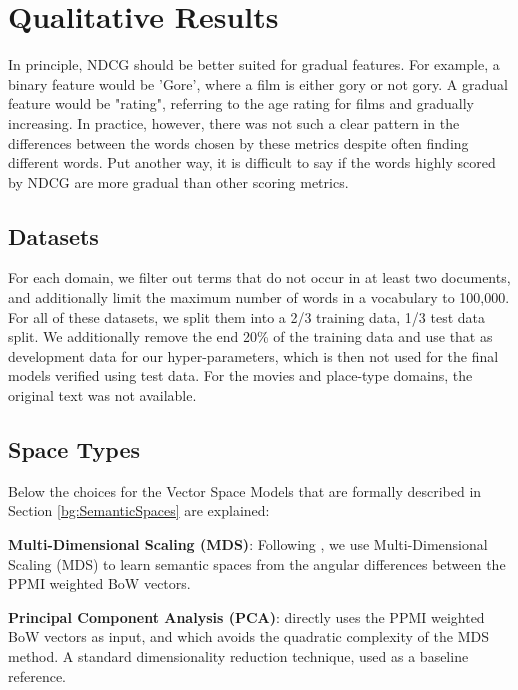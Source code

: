 \section{Qualitative Results}
In principle, NDCG should be better suited for gradual features. For example, a binary feature would be 'Gore', where a film is either gory or not gory. A gradual feature would be "rating", referring to the age rating for films and gradually increasing. In practice, however, there was not such a clear pattern in the differences between the words chosen by these metrics despite often finding different words. Put another way, it is difficult to say if the words highly scored by NDCG are more gradual than other scoring metrics.
\subsection{Datasets}\label{ch3:datasets}



 For each domain, we filter out terms that do not occur in at least two documents, and additionally limit the maximum number of words in a vocabulary to 100,000. For all of these datasets, we split them into a 2/3 training data, 1/3 test data split. We additionally remove the end 20\% of the training data and use that as development data for our hyper-parameters, which is then not used for the final models verified using test data.  For the movies and place-type domains, the original text was not available.



\subsection{Space Types}

Below the choices for the Vector Space Models that are formally described in Section \ref{bg:SemanticSpaces} are explained:

\textbf{Multi-Dimensional Scaling (MDS)}: Following \cite{derracAIJ}, we use Multi-Dimensional Scaling (MDS) to learn semantic spaces from the angular differences between the PPMI weighted BoW vectors. %

\textbf{Principal Component Analysis (PCA)}: directly uses the PPMI weighted BoW vectors as input, and which avoids the quadratic complexity of the MDS method. A standard dimensionality reduction technique, used as a baseline reference.

